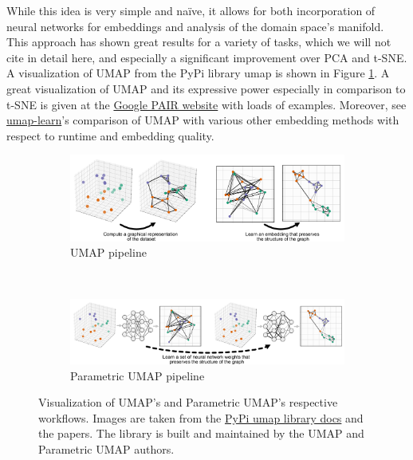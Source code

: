 \documentclass[]{article}
\begin{document}
While this idea is very simple and na\"ive, it allows for both incorporation of neural networks for embeddings and analysis of the domain space's manifold. This approach has shown great results for a variety of tasks, which we will not cite in detail here, and especially a significant improvement over PCA and t-SNE.
A visualization of UMAP from the PyPi library umap is shown in Figure \ref{fig:umap_vis}.
A great visualization of UMAP and its expressive power especially in comparison to t-SNE is given at the \href{https://pair-code.github.io/understanding-umap/}{Google PAIR website} with loads of examples. Moreover, see \href{https://umap-learn.readthedocs.io/en/latest/performance.html}{umap-learn}'s comparison of UMAP with various other embedding methods with respect to runtime and embedding quality.

\begin{figure}
	\centering
	\begin{subfigure}{1.\textwidth}
		\centering
		\includegraphics[width=.90\linewidth]{figures/umap-only.png}
		\caption{UMAP pipeline}
		\label{fig:umap_vis}
	\end{subfigure}\\
	\begin{subfigure}{1.\textwidth}
		\centering
		\includegraphics[width=0.90\linewidth]{figures/pumap-only.png}
		\caption{Parametric UMAP pipeline}
		\label{fig:para_umap_vis}
	\end{subfigure}
	

	\caption{Visualization of UMAP's and  Parametric UMAP's respective workflows. Images are taken from the \href{https://umap-learn.readthedocs.io/en/latest/parametric_umap.html}{PyPi umap library docs} and the papers. The library is built and maintained by the UMAP and Parametric UMAP authors.}
	\label{fig:umap_visualizations}
\end{figure}
\end{document}
